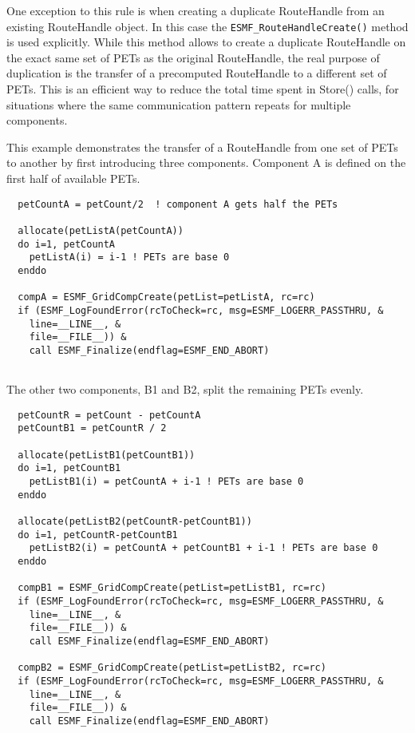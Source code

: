    One exception to this rule is when creating a duplicate RouteHandle from an
   existing RouteHandle object. In this case the {\tt ESMF\_RouteHandleCreate()}
   method is used explicitly. While this method allows to create a duplicate 
   RouteHandle on the exact same set of PETs as the original RouteHandle, the 
   real purpose of duplication is the transfer of a precomputed RouteHandle to a
   different set of PETs. This is an efficient way to reduce the total time
   spent in Store() calls, for situations where the same communication pattern
   repeats for multiple components.
  
   This example demonstrates the transfer of a RouteHandle from one set of PETs
   to another by first introducing three components. Component A is defined
   on the first half of available PETs. 

 \begin{verbatim}
  petCountA = petCount/2  ! component A gets half the PETs

  allocate(petListA(petCountA))
  do i=1, petCountA
    petListA(i) = i-1 ! PETs are base 0
  enddo
  
  compA = ESMF_GridCompCreate(petList=petListA, rc=rc)
  if (ESMF_LogFoundError(rcToCheck=rc, msg=ESMF_LOGERR_PASSTHRU, &
    line=__LINE__, &
    file=__FILE__)) &
    call ESMF_Finalize(endflag=ESMF_END_ABORT)
 
\end{verbatim}
 

   The other two components, B1 and B2, split the remaining PETs evenly. 

 \begin{verbatim}
  petCountR = petCount - petCountA
  petCountB1 = petCountR / 2
  
  allocate(petListB1(petCountB1))
  do i=1, petCountB1
    petListB1(i) = petCountA + i-1 ! PETs are base 0
  enddo

  allocate(petListB2(petCountR-petCountB1))
  do i=1, petCountR-petCountB1
    petListB2(i) = petCountA + petCountB1 + i-1 ! PETs are base 0
  enddo

  compB1 = ESMF_GridCompCreate(petList=petListB1, rc=rc)
  if (ESMF_LogFoundError(rcToCheck=rc, msg=ESMF_LOGERR_PASSTHRU, &
    line=__LINE__, &
    file=__FILE__)) &
    call ESMF_Finalize(endflag=ESMF_END_ABORT)

  compB2 = ESMF_GridCompCreate(petList=petListB2, rc=rc)
  if (ESMF_LogFoundError(rcToCheck=rc, msg=ESMF_LOGERR_PASSTHRU, &
    line=__LINE__, &
    file=__FILE__)) &
    call ESMF_Finalize(endflag=ESMF_END_ABORT)
 
\end{verbatim}
 
